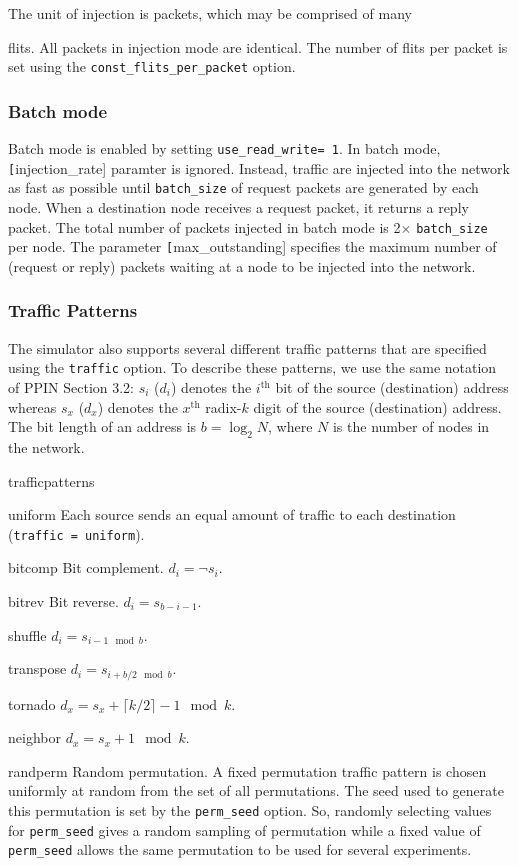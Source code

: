 \documentclass[11pt]{article}
\begin{document}
The unit of injection is packets, which may be comprised of many

flits. All packets in injection mode are identical. The number of flits per packet is set using the
\texttt{const\_flits\_per\_packet} option. 

\subsubsection{Batch mode}
Batch mode is enabled by setting \texttt{use\_read\_write= 1}. In batch mode, \texttt[injection\_rate] paramter is ignored. Instead, traffic are injected into the network as fast as possible until \texttt{batch\_size} of request packets are generated by each node. When a destination node receives a request packet, it returns a reply packet. The total number of packets injected in batch mode is 2$\times$ \texttt{batch\_size} per node. The parameter \texttt[max\_outstanding] specifies the maximum number of (request or reply) packets waiting at a node to be injected into the network. 

\subsubsection{Traffic Patterns}
The simulator also supports several different traffic patterns that
are specified using the \texttt{traffic} option.  To describe these
patterns, we use the same notation of PPIN Section 3.2: $s_i$ ($d_i$)
denotes the $i^\textrm{th}$ bit of the source (destination) address
whereas $s_x$ ($d_x$) denotes the $x^\textrm{th}$ radix-$k$ digit of
the source (destination) address.  The bit length of an address is $b
= \log_2 N$, where $N$ is the number of nodes in the network.

\begin{opt_list}{trafficpatterns}
\item[uniform] Each source sends an equal amount of traffic to each
destination (\texttt{traffic = uniform}).
\item[bitcomp] Bit complement. $d_i = \neg s_i$.
\item[bitrev] Bit reverse. $d_i = s_{b-i-1}$.
\item[shuffle] $d_i = s_{i-1 \mod b}$.
\item[transpose] $d_i = s_{i+b/2 \mod b}$.
\item[tornado] $d_x = s_x + \lceil k/2 \rceil - 1 \mod k$.
\item[neighbor] $d_x = s_x + 1 \mod k$.
\item[randperm] Random permutation.  A fixed permutation traffic
pattern is chosen uniformly at random from the set of all
permutations.  The seed used to generate this permutation is set by
the \texttt{perm\_seed} option.  So, randomly selecting values for
\texttt{perm\_seed} gives a random sampling of permutation while a
fixed value of \texttt{perm\_seed} allows the same permutation to be
used for several experiments.
\end{opt_list}
\end{document}
